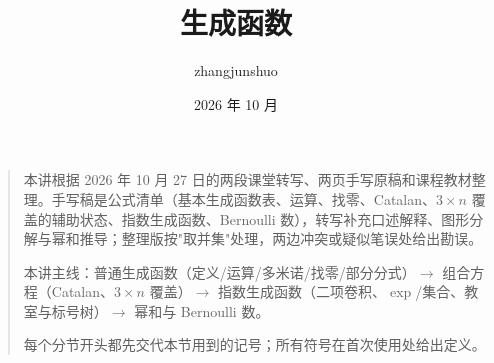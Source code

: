 \documentclass[UTF8,a4paper,11pt]{ctexart}
\title{生成函数}\author{zhangjunshuo}\date{2026 年 10 月}
\begin{document}
\maketitle
\begin{quote}
本讲根据 2026 年 10 月 27 日的两段课堂转写、两页手写原稿和课程教材整理。手写稿是公式清单（基本生成函数表、运算、找零、Catalan、$3\times n$ 覆盖的辅助状态、指数生成函数、Bernoulli 数），转写补充口述解释、图形分解与幂和推导；整理版按"取并集"处理，两边冲突或疑似笔误处给出勘误。

本讲主线：普通生成函数（定义/运算/多米诺/找零/部分分式）$\to$ 组合方程（Catalan、$3\times n$ 覆盖）$\to$ 指数生成函数（二项卷积、$\exp$/集合、教室与标号树）$\to$ 幂和与 Bernoulli 数。

每个分节开头都先交代本节用到的记号；所有符号在首次使用处给出定义。
\end{quote}
\tableofcontents\clearpage







\end{document}
